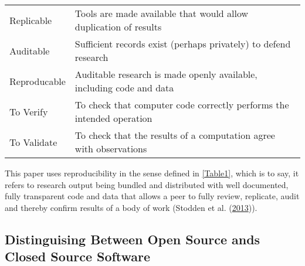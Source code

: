 \documentclass[11pt,preprint, authoryear]{elsarticle}
\numberwithin{equation}{section}
\numberwithin{figure}{section}
\numberwithin{table}{section}
\begin{document}
\begin{longtable}[]{@{}ll@{}}
\begin{minipage}[t]{0.18\columnwidth}
Replicable\strut
\end{minipage} & \begin{minipage}[t]{0.61\columnwidth}\raggedright\strut
Tools are made available that would allow duplication of results\strut
\end{minipage}\tabularnewline
\begin{minipage}[t]{0.18\columnwidth}\raggedright\strut
Auditable\strut
\end{minipage} & \begin{minipage}[t]{0.61\columnwidth}\raggedright\strut
Sufficient records exist (perhaps privately) to defend research\strut
\end{minipage}\tabularnewline
\begin{minipage}[t]{0.18\columnwidth}\raggedright\strut
Reproducable\strut
\end{minipage} & \begin{minipage}[t]{0.61\columnwidth}\raggedright\strut
Auditable research is made openly available, including code and
data\strut
\end{minipage}\tabularnewline
\begin{minipage}[t]{0.18\columnwidth}\raggedright\strut
To Verify\strut
\end{minipage} & \begin{minipage}[t]{0.61\columnwidth}\raggedright\strut
To check that computer code correctly performs the intended
operation\strut
\end{minipage}\tabularnewline
\begin{minipage}[t]{0.18\columnwidth}\raggedright\strut
To Validate\strut
\end{minipage} & \begin{minipage}[t]{0.61\columnwidth}\raggedright\strut
To check that the results of a computation agree with observations\strut
\end{minipage}\tabularnewline
\bottomrule
\end{longtable}

This paper uses reproducibility in the sense defined in \ref{Table1},
which is to say, it refers to research output being bundled and
distributed with well documented, fully transparent code and data that
allows a peer to fully review, replicate, audit and thereby confirm
results of a body of work (Stodden et al.
(\protect\hyperlink{ref-Stodden2013}{2013})).

\subsection{Distinguising Between Open Source ands Closed Source
Software}\label{distinguising-between-open-source-ands-closed-source-software}
\end{document}
